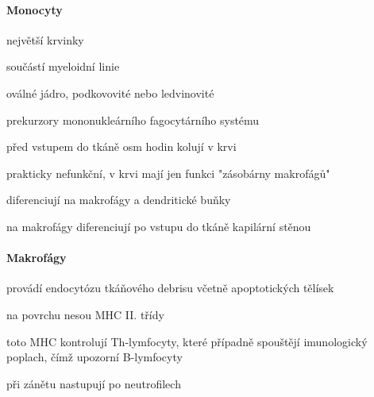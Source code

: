 \documentclass[DIV=8]{scrreprt}
\begin{document}
\paragraph{Monocyty}
\begin{myItemize}[nosep]
    \item největší krvinky
    \item součástí myeloidní linie
    \item oválné jádro, podkovovité nebo ledvinovité
    \item prekurzory mononukleárního fagocytárního systému
    \item před vstupem do tkáně osm hodin kolují v krvi
    \item prakticky nefunkční, v krvi mají jen funkci "zásobárny makrofágů"
    \item diferenciují na makrofágy a dendritické buňky
\begin{myItemize}[nosep]
    \item na makrofágy diferenciují po vstupu do tkáně kapilární stěnou
\end{myItemize}

\end{myItemize}



\paragraph{Makrofágy}
\begin{myItemize}[nosep]
    \item provádí endocytózu tkáňového debrisu včetně apoptotických tělísek
    \item na povrchu nesou MHC II. třídy
\begin{myItemize}[nosep]
    \item toto MHC kontrolují Th-lymfocyty, které případně spouštějí imunologický poplach, čímž upozorní B-lymfocyty
\end{myItemize}

    \item při zánětu nastupují po neutrofilech
\end{myItemize}
\end{document}
